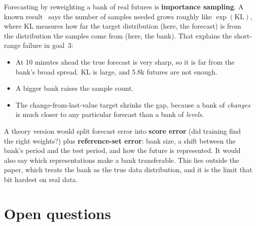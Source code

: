\documentclass[11pt]{article}
\begin{document}
Forecasting by reweighting a bank of real futures is \textbf{importance sampling}. A known
result~\cite{cd} says the number of samples needed grows roughly like
$\exp(\mathrm{KL})$, where KL measures how far the target distribution (here, the forecast)
is from the distribution the samples come from (here, the bank). That explains the
short-range failure in goal~3:
\begin{itemize}
\item At 10 minutes ahead the true forecast is very sharp, so it is far from the bank's
  broad spread. KL is large, and 5.8k futures are not enough.
\item A bigger bank raises the sample count.
\item The change-from-last-value target shrinks the gap, because a bank of \emph{changes}
  is much closer to any particular forecast than a bank of \emph{levels}.
\end{itemize}
A theory version would split forecast error into \textbf{score error} (did training find
the right weights?) plus \textbf{reference-set error}: bank size, a shift between the bank's
period and the test period, and how the future is represented. It would also say which
representations make a bank transferable. This lies outside the paper, which treats the
bank as the true data distribution, and it is the limit that bit hardest on real data.

\section{Open questions}
\end{document}
